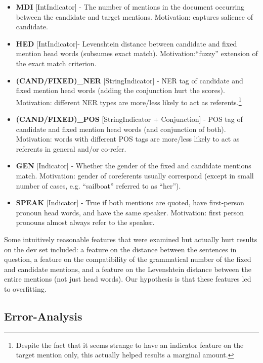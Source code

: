 \documentclass[12pt,a4paper]{article}
\begin{document}
\begin{itemize}[itemsep=-1pt]
\item
	\textbf{MDI} [IntIndicator] - The number of mentions in the document occurring between the candidate and target mentions. Motivation: captures salience of candidate. 
\item
	\textbf{HED} [IntIndicator]- Levenshtein distance between candidate and fixed mention head words (subsumes exact match).  Motivation:``fuzzy'' extension of the exact match criterion. 
\item
	\textbf{(CAND/FIXED)\_NER} [StringIndicator] - NER tag of candidate and fixed mention head words (adding the conjunction hurt the scores). Motivation: different NER types are more/less likely to act as referents.\footnote{Despite the fact that it seems strange to have an indicator feature on the target mention only, this actually helped results a marginal amount.}
\item
	\textbf{(CAND/FIXED)\_POS} [StringIndicator + Conjunction] - POS tag of candidate and fixed mention head words (and conjunction of both). Motivation: words with different POS tags are more/less likely to act as referents in general and/or co-refer.
\item
	\textbf{GEN} [Indicator] - Whether the gender of the fixed and candidate mentions match. Motivation: gender of coreferents usually correspond (except in small number of cases, e.g. ``sailboat'' referred to as ``her''). 
\item
	\textbf{SPEAK} [Indicator] - True if both mentions are quoted,  have first-person pronoun head words, and have the same speaker. Motivation: first person pronouns almost always refer to the speaker. 
\end{itemize}
	
Some intuitively reasonable features that were examined but actually hurt results on the dev set included: a feature on the distance between the sentences in question, a feature on the compatibility of the grammatical number of the fixed and candidate mentions, and a feature on the Levenshtein distance between the entire mentions (not just head words).
Our hypothesis is that these features led to overfitting. 

\subsection{Error-Analysis}
\end{document}
